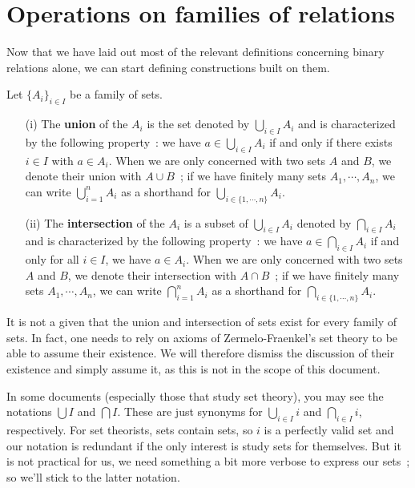 \section{Operations on families of relations} \label{operations-on-families-of-relations}

Now that we have laid out most of the relevant definitions concerning binary relations alone, we can start defining constructions built on them. 
\\

\begin{definition}
	Let $\{A_i\}_{i \in I}$ be a family of sets.
	\\
	
	\begin{itemize}
		\item[(i)] The \textbf{union} of the $A_i$ is the set denoted by $\bigcup_{i \in I} A_i$ and is characterized by the following property~: we have $a \in \bigcup_{i \in I} A_i$ if and only if there exists $i \in I$ with $a \in A_i$. When we are only concerned with two sets $A$ and $B$, we denote their union with $A \cup B$~; if we have finitely many sets $A_1,\cdots,A_n$, we can write $\bigcup_{i=1}^n A_i$ as a shorthand for $\bigcup_{i \in \{1,\cdots,n\}} A_i$. 
		\\

		\item[(ii)] The \textbf{intersection} of the $A_i$ is a subset of $\bigcup_{i \in I} A_i$ denoted by $\bigcap_{i \in I} A_i$ and is characterized by the following property~: we have $a \in \bigcap_{i \in I} A_i$ if and only for all $i \in I$, we have $a \in A_i$. When we are only concerned with two sets $A$ and $B$, we denote their intersection with $A \cap B$~; if we have finitely many sets $A_1,\cdots,A_n$, we can write $\bigcap_{i=1}^n A_i$ as a shorthand for $\bigcap_{i \in \{1,\cdots,n\}} A_i$. 
		\\
	\end{itemize}
\end{definition}

\begin{remark}
	It is not a given that the union and intersection of sets exist for every family of sets. In fact, one needs to rely on axioms of Zermelo-Fraenkel's set theory to be able to assume their existence. We will therefore dismiss the discussion of their existence and simply assume it, as this is not in the scope of this document.
\end{remark}

\begin{remark}
	In some documents (especially those that study set theory), you may see the notations $\bigcup I$ and $\bigcap I$. These are just synonyms for $\bigcup_{i \in I} i$ and $\bigcap_{i \in I} i$, respectively. For set theorists, sets contain sets, so $i$ is a perfectly valid set and our notation is redundant if the only interest is study sets for themselves. But it is not practical for us, we need something a bit more verbose to express our sets~; so we'll stick to the latter notation.
\end{remark}

